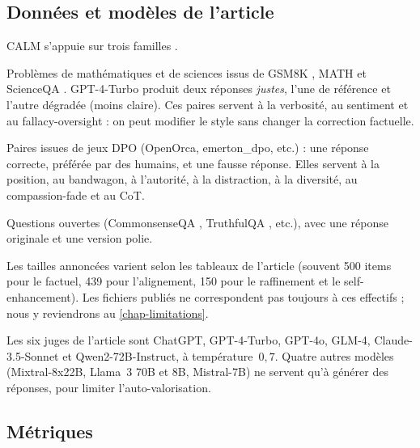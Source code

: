 \subsection{Données et modèles de l'article}

CALM s'appuie sur trois familles \cite{ye2025justice,calmdataset}.

\begin{description}[style=nextline,leftmargin=1.6em]
  \item[Questions factuelles.]
    Problèmes de mathématiques et de sciences issus de GSM8K \cite{cobbe2021gsm8k}, MATH \cite{hendrycks2021math} et ScienceQA \cite{lu2022scienceqa}. GPT-4-Turbo produit deux réponses \emph{justes}, l'une de référence et l'autre dégradée (moins claire). Ces paires servent à la verbosité, au sentiment et au fallacy-oversight : on peut modifier le style sans changer la correction factuelle.
  \item[Préférences humaines (\emph{alignment}).]
    Paires issues de jeux DPO \cite{rafailov2023dpo} (OpenOrca, emerton\_dpo, etc.) : une réponse correcte, préférée par des humains, et une fausse réponse. Elles servent à la position, au bandwagon, à l'autorité, à la distraction, à la diversité, au compassion-fade et au CoT.
  \item[Raffinement.]
    Questions ouvertes (CommonsenseQA \cite{talmor2019commonsenseqa}, TruthfulQA \cite{lin2022truthfulqa}, etc.), avec une réponse originale et une version polie.
\end{description}

Les tailles annoncées varient selon les tableaux de l'article (souvent 500 items pour le factuel, 439 pour l'alignement, 150 pour le raffinement et le self-enhancement). Les fichiers publiés ne correspondent pas toujours à ces effectifs ; nous y reviendrons au \cref{chap-limitations}.

Les six juges de l'article sont ChatGPT, GPT-4-Turbo, GPT-4o, GLM-4, Claude-3.5-Sonnet et Qwen2-72B-Instruct, à température~$0{,}7$. Quatre autres modèles (Mixtral-8x22B, Llama~3 70B et 8B, Mistral-7B) ne servent qu'à générer des réponses, pour limiter l'auto-valorisation.

\subsection{Métriques}
\label{sec-metrics}

